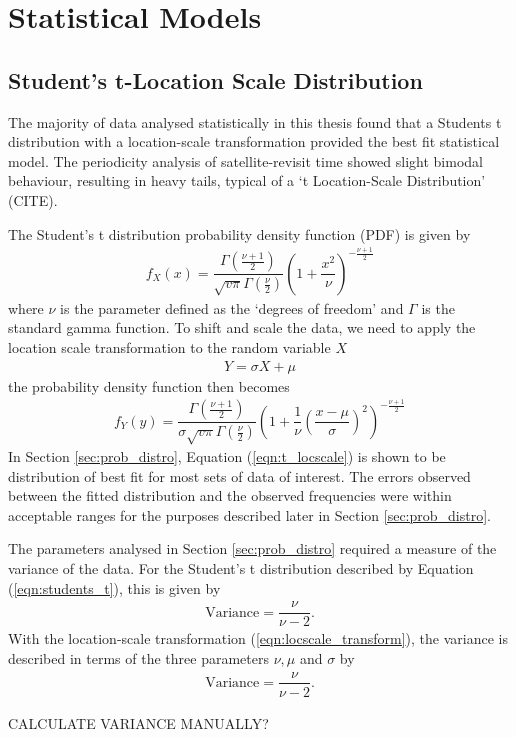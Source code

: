 \section{Statistical Models} \label{sec:stats}
\subsection{Student's t-Location Scale Distribution}
The majority of data analysed statistically in this thesis found that a Students t distribution with a location-scale transformation provided the best fit statistical model. The periodicity analysis of satellite-revisit time showed slight bimodal behaviour, resulting in heavy tails, typical of a `t Location-Scale Distribution' (CITE). 

The Student's t distribution probability density function (PDF) is given by
\begin{align}
	f_X(x) = \dfrac{\Gamma\left(\frac{\nu+ 1}{2}\right)}{\sqrt{v\pi} \Gamma \left(\frac{\nu}{2}\right)} \left( 1 + \dfrac{x^2}{\nu} \right) ^{-\frac{\nu + 1}{2}} \label{eqn:students_t}
\end{align}
where $\nu$ is the parameter defined as the `degrees of freedom' and $\Gamma$ is the standard gamma function. To shift and scale the data, we need to apply the location scale transformation to the random variable $X$
\begin{align}
	Y = \sigma X + \mu \label{eqn:locscale_transform}
\end{align}
the probability density function then becomes 
\begin{align}
	f_Y(y) = \dfrac{\Gamma\left(\frac{\nu+ 1}{2}\right)}{\sigma\sqrt{v\pi} \Gamma \left(\frac{\nu}{2}\right)} \left( 1 + \dfrac{1}{\nu} \left(\dfrac{x - \mu }{\sigma}\right)^2 \right) ^{-\frac{\nu + 1}{2}} \label{eqn:t_locscale}
\end{align}
In Section \ref{sec:prob_distro}, Equation (\ref{eqn:t_locscale}) is shown to be distribution of best fit for most sets of data of interest. The errors observed between the fitted distribution and the observed frequencies were within acceptable ranges for the purposes described later in Section \ref{sec:prob_distro}.

The parameters analysed in Section \ref{sec:prob_distro} required a measure of the variance of the data. For the Student's t distribution described by Equation (\ref{eqn:students_t}), this is given by
\begin{align}
	\text{Variance} = \dfrac{\nu}{\nu-2}.
\end{align}
With the location-scale transformation (\ref{eqn:locscale_transform}), the variance is described in terms of the three parameters $\nu, \mu$ and $\sigma$ by
\begin{align}
	\text{Variance} = \dfrac{\nu}{\nu-2}.
\end{align}

CALCULATE VARIANCE MANUALLY?